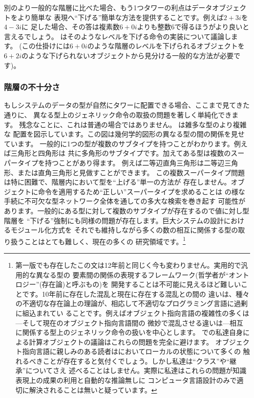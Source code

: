 別のより一般的な階層に比べた場合、もう1つタワーの利点はデータオブジェクトをより簡単な
表現へ``下げる''簡単な方法を提供することです。例えば\( 2 + 3i \)を\( 4 - 3i \)に
足した場合、その答は複素数\( 6 + 0i \)よりも整数6で得るほうがより良いと言えるでしょう。
はそのようなレベルを下げる命令の実装について議論します。
(この仕掛けには\( 6 + 0i \)のような階層のレベルを下げられるオブジェクトを
\( 6 + 2i \)のような下げられないオブジェクトから見分ける一般的な方法が必要です)。

\subsubsection*{階層の不十分さ}



もしシステムのデータの型が自然にタワーに配置できる場合、ここまで見てきた通りに、
異なる型上のジェネリック命令の取扱の問題を著しく単純化できます。
残念なことに、これは普通の場合ではありません。 は雑多な型のより複雑な
配置を図示しています。この図は幾何学的図形の異なる型の間の関係を見せています。
一般的に1つの型が複数のサブタイプを持つことがわかります。例えば三角形と四角形は
共に多角形のサブタイプです。加えてある型は複数のスーパータイプを持つことがあり得ます。
例えば二等辺直角三角形は二等辺三角形、または直角三角形と見做すことができます。
この複数スーパータイプ問題は特に困難で、階層内において型を``上げる''単一の方法が
存在しません。オブジェクトに命令を適用するため``正しい''スーパータイプを求めることは
の様な手続に不可欠な型ネットワーク全体を通しての多大な検索を巻き起す
可能性があります。一般的にある型に対して複数のサブタイプが存在するので値に対し型階層を
``下げる''強制にも同様の問題が存在します。巨大システムの設計におけるモジュール化方式を
それでも維持しながら多くの数の相互に関係する型の取り扱うことはとても難しく、現在の多くの
研究領域です。\footnote{
第一版でも存在したこの文は12年前と同じく今も変わりません。実用的で汎用的な異なる型の
要素間の関係の表現するフレームワーク(哲学者が``オントロジー''(存在論)と呼ぶもの)を
開発することは不可能に見えるほど難しいことです。10年前に存在した混乱と現在に存在する混乱との間の
違いは、種々の不適切な存在論上の理論が、相応して不適切なプログラミング言語に過剰に組込まれてい
ることです。例えばオブジェクト指向言語の複雑性の多くは---そして現在のオブジェクト指向言語間の
微妙で混乱させる違いは---相互に関係する型上のジェネリック命令の扱いを中心とします。
での私達自身による計算オブジェクトの議論はこれらの問題を完全に避けます。
オブジェクト指向言語に親しみのある読者はにおいてローカルの状態について多くの
触れるべきことが存在すると気付くでしょう。しかし私達は``クラス''や``継承''についてさえ
述べることはしません。実際に私達はこれらの問題が知識表現上の成果の利用と自動的な推論無しに
コンピュータ言語設計のみで適切に解決されることは無いと疑っています。}

